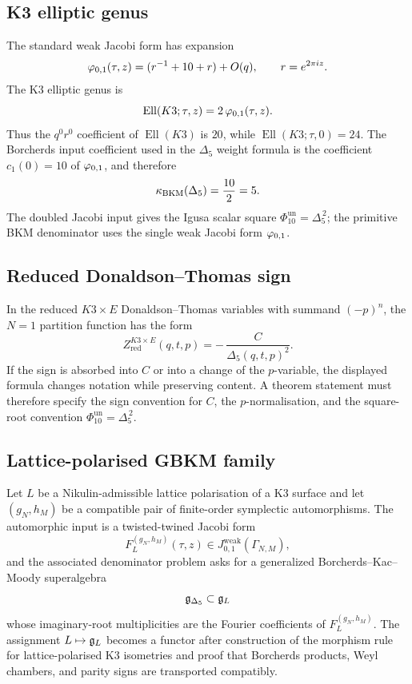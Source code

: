 \subsection*{K3 elliptic genus}

The standard weak Jacobi form has expansion
\[
  \varphi_{0,1}(\tau,z)=(r^{-1}+10+r)+O(q),
  \qquad r=e^{2\pi iz}.
\]
The K3 elliptic genus is
\[
  \operatorname{Ell}(K3;\tau,z)=2\,\varphi_{0,1}(\tau,z).
\]
Thus the $q^0r^0$ coefficient of $\operatorname{Ell}(K3)$ is $20$,
while $\operatorname{Ell}(K3;\tau,0)=24$.  The Borcherds input
coefficient used in the $\Delta_{5}$ weight formula is the coefficient
$c_1(0)=10$ of $\varphi_{0,1}$, and therefore
\[
  \kappa_{\mathrm{BKM}}(\Delta_{5})=\frac{10}{2}=5 .
\]
The doubled Jacobi input gives the Igusa scalar square
$\Phi_{\!10}^{\mathrm{un}}=\Delta_{5}^{\,2}$; the primitive BKM
denominator uses the single weak Jacobi form $\varphi_{0,1}$.

\subsection*{Reduced Donaldson--Thomas sign}

In the reduced $K3\times E$ Donaldson--Thomas variables with summand
$(-p)^n$, the $N=1$ partition function has the form
\[
  Z^{K3\times E}_{\mathrm{red}}(q,t,p)=-\,\frac{C}{\Delta_{5}(q,t,p)^2}.
\]
If the sign is absorbed into $C$ or into a change of the $p$-variable,
the displayed formula changes notation while preserving content.  A theorem
statement must therefore specify the sign convention for $C$, the
$p$-normalisation, and the square-root convention
$\Phi_{\!10}^{\mathrm{un}}=\Delta_{5}^{\,2}$.

\subsection*{Lattice-polarised GBKM family}

Let $L$ be a Nikulin-admissible lattice polarisation of a K3 surface and
let $(g_N,h_M)$ be a compatible pair of finite-order symplectic
automorphisms.  The automorphic input is a twisted-twined Jacobi form
\[
  F_L^{(g_N,h_M)}(\tau,z)\in J^{\mathrm{weak}}_{0,1}(\Gamma_{N,M}),
\]
and the associated denominator problem asks for a generalized
Borcherds--Kac--Moody superalgebra
\[
  \mathfrak{g}_{\Delta_{5}}\subset \mathfrak{g}_L
\]
whose imaginary-root multiplicities are the Fourier coefficients of
$F_L^{(g_N,h_M)}$.  The assignment
$L\mapsto\mathfrak{g}_L$ becomes a functor after construction of the morphism
rule for lattice-polarised K3 isometries and proof that Borcherds
products, Weyl chambers, and parity signs are transported compatibly.

